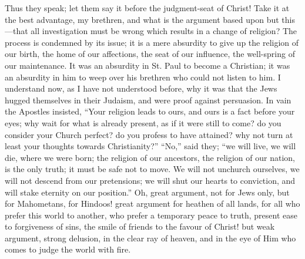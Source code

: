 Thus they speak; let them say it before the judgment-seat of
Christ! Take it at the best advantage, my brethren, and what is the
argument based upon but this—that all investigation must be wrong
which results in a change of religion? The process is condemned by its
issue; it is a mere absurdity to give up the religion of our birth,
the home of our affections, the seat of our influence, the well-spring
of our maintenance. It was an absurdity in St. Paul to become a
Christian; it was an absurdity in him to weep over his brethren who
could not listen to him. I understand now, as I have not understood
before, why it was that the Jews hugged themselves in their Judaism,
and were proof against persuasion. In vain the Apostles insisted,
``Your religion leads to ours, and ours is a fact before your
eyes; why wait for what is already present, as if it were still to
come? do you consider your Church perfect? do you profess to have
attained? why not turn at least your thoughts towards
Christianity?'' ``No,'' said they; ``we will live, we
will die, where we were born; the religion of our ancestors, the
religion of our nation, is the only truth; it must be safe not to
move. We will not unchurch ourselves, we will not descend from our
pretensions; we will shut our hearts to conviction, and will stake
eternity on our position.'' Oh, great argument, not for Jews only,
but for Mahometans, for Hindoos! great argument for heathen of all
lands, for all who prefer this world to another, who prefer a
temporary peace to truth, present ease to forgiveness of sins, the
smile of friends to the favour of Christ! but weak argument, strong
delusion, in the clear ray of heaven, and in the eye of Him who comes
to judge the world with fire.


